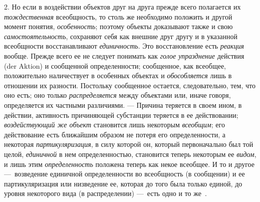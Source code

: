 \documentclass[twoside]{article}
\begin{document}
{{{{{{2. Но если в воздействии объектов друг на друга прежде всего
полагается их {\em тождественная}
всеобщность, то столь же необходимо положить и другой момент
понятия, {\em особенность};
поэтому объекты доказывают также и свою
{\em самостоятельность},
сохраняют себя как внешние друг другу и в указанной
всеобщности восстанавливают
{\em единичность}. Это
восстановление есть {\em реакция}
вообще. Прежде всего ее не следует понимать
как {\em голое упразднение}
действия (der Aktion) и сообщенной
определенности; сообщенное, как всеобщее, положительно наличествует в
особенных объектах и {\em обособляется}
лишь в отношении их разности. Постольку сообщенное остается,
следовательно, тем, что оно есть; оно только
{\em распределяется}
между объектами или, иначе говоря, определяется их частными
различиями. — Причина теряется в своем ином, в действии,
активность причиняющей субстанции теряется в ее действовании;
{\em воздействующий же объект}
становится лишь некоторым
{\em всеобщим}; его
действование есть ближайшим образом не потеря его определенности, а
некоторая {\em партикуляризация},
в силу которой он, который первоначально был той целой,
{\em единичной} в нем
определенностью, становится теперь некоторым ее
{\em видом}, и лишь этим
{\em определенность}
положена теперь как некое всеобщее. И то и другое
—~возведение единичной определенности во всеобщность (в
сообщении) и ее партикуляризация или низведение ее, которая до того была
только единой, до уровня некоторого вида (в распределении)
—~есть одно и то
же~\label{bkm:bm69}.

}}}}}}
\end{document}
